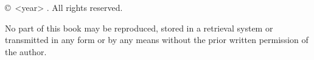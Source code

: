 %
%
\thispagestyle{empty}
\vspace*{\fill}
\noindent\BookTitle

\medskip
\noindent\copyright\ <year> \BookAuthor. All rights reserved.

\medskip
\noindent No part of this book may be reproduced, stored in a retrieval
system or transmitted in any form or by any means without the prior
written permission of the author.

\bigskip
\noindent\BuildLine
\clearpage
